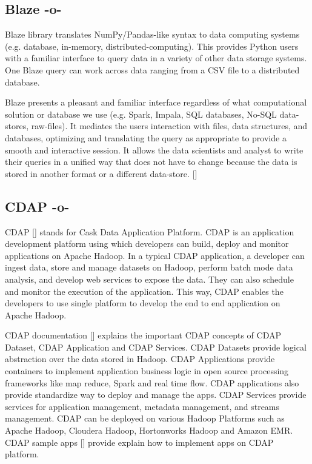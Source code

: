 \subsection{Blaze -o-}

Blaze library translates NumPy/Pandas-like syntax to data computing
systems (e.g. database, in-memory, distributed-computing). This
provides Python users with a familiar interface to query data in a
variety of other data storage systems.  One Blaze query can work
across data ranging from a CSV file to a distributed database.

Blaze presents a pleasant and familiar interface regardless of what
computational solution or database we use (e.g. Spark, Impala, SQL
databases, No-SQL data-stores, raw-files). It mediates the users
interaction with files, data structures, and databases, optimizing and
translating the query as appropriate to provide a smooth and
interactive session. It allows the data scientists and analyst to
write their queries in a unified way that does not have to change
because the data is stored in another format or a different
data-store. [\cite{www-blaze}]

\subsection{CDAP -o-}

CDAP [\cite{www-cdap}] stands for Cask Data Application Platform. CDAP
is an application development platform using which developers can
build, deploy and monitor applications on Apache Hadoop. In a typical
CDAP application, a developer can ingest data, store and manage
datasets on Hadoop, perform batch mode data analysis, and develop web
services to expose the data.  They can also schedule and monitor the
execution of the application. This way, CDAP enables the developers to
use single platform to develop the end to end application on Apache
Hadoop.

CDAP documentation [\cite{www-cdap-docs}] explains the important CDAP
concepts of CDAP Dataset, CDAP Application and CDAP Services. CDAP
Datasets provide logical abstraction over the data stored in
Hadoop. CDAP Applications provide containers to implement application
business logic in open source processing frameworks like map reduce,
Spark and real time flow. CDAP applications also provide standardize
way to deploy and manage the apps. CDAP Services provide services for
application management, metadata management, and streams management.
CDAP can be deployed on various Hadoop Platforms such as Apache
Hadoop, Cloudera Hadoop, Hortonworks Hadoop and Amazon EMR.  CDAP
sample apps [\cite{github-cdap-sample-apps}] provide explain how to
implement apps on CDAP platform.

